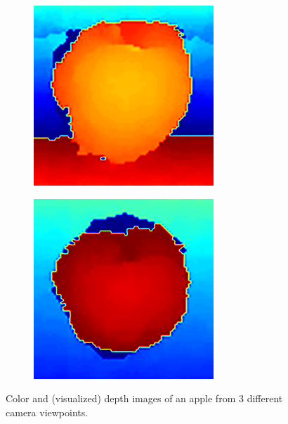 \begin{figure}
\begin{subfigure}[b]{0.3\linewidth}
    	\caption{}
	\end{subfigure}
    \begin{subfigure}[b]{0.3\linewidth}
	    \includegraphics[width=\textwidth]{images/apple_1_2_1_depthcrop.png}
    	\caption{}
	\end{subfigure}
    \begin{subfigure}[b]{0.3\linewidth}
	    \includegraphics[width=\textwidth]{images/apple_1_4_1_depthcrop.png}
    	\caption{}
	\end{subfigure}
    \caption{Color and (visualized) depth images of an apple from 3 different camera viewpoints.}
    \label{fig:apple_3_viewpoints}
\end{figure}

